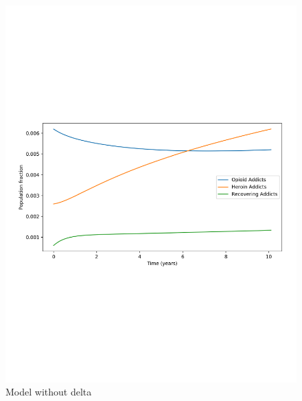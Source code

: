 \documentclass[12pt]{article}
\begin{document}
\begin{figure}[!htb]
\begin{minipage}{.6\textwidth}
\includegraphics[width=.9\linewidth, height=0.27\textheight]{plot_remove_delta_separate}
\vspace{-.5cm}
\caption{Model without delta}
\end{minipage}
\end{figure}

\vspace{-1.4cm}
\end{document}

